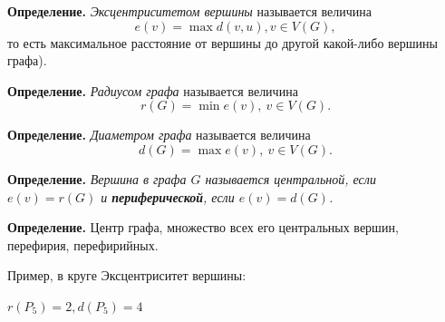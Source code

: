 \documentclass[a4paper, 12pt]{article}
\theoremstyle{definition}
\theoremstyle{definition}
\begin{document}
  \textbf{Определение.} \textit{Эксцентриситетом вершины} называется величина $$e(v)=\max d(v,u),v\in V(G),$$ то есть максимальное расстояние от вершины до другой какой-либо вершины графа).
  
  \textbf{Определение.} \textit{Радиусом графа} называется величина $$r(G)=\min e(v),\ v\in V(G).$$
  
  \textbf{Определение.} \textit{Диаметром графа} называется величина $$d(G)=\max e(v),\ v\in V(G).$$
  
  \textbf{Определение.} \textit{Вершина в графа $G$ называется \textit{центральной}, если $e(v)=r(G)$ и \textbf{периферической}, если $e(v)=d(G)$.}
  
  \textbf{Определение.} Центр графа, множество всех его центральных вершин, перефирия, перефирийных.
  
  Пример, в круге Эксцентриситет вершины:

  $r(P_5)=2, d(P_5)=4$
  
\end{document}
